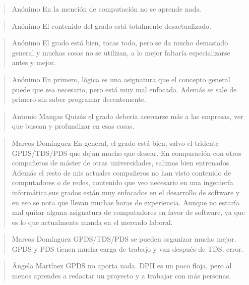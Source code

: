 \begin{quote}{Anónimo}
    En la mención de computación no se aprende nada.
\end{quote}

\begin{quote}{Anónimo}
    El contenido del grado está totalmente desactualizado.
\end{quote}

\begin{quote}{Anónimo}
    El grado está bien, tocas todo, pero se da mucho demasiado general y
    muchas cosas no se utilizan, a lo mejor faltaría especializarse antes
    y mejor.
\end{quote}

\begin{quote}{Anónimo}
    En primero, lógica es una asignatura que el concepto general puede que 
    sea necesario, pero está muy mal enfocada. Además se sale de primero 
    sin saber programar decentemente.
\end{quote}

\begin{quote}{Antonio Mangas}
    Quizás el grado debería acercarse más a las empresas, ver que buscan y 
    profundizar en esas cosas. 
\end{quote}

\begin{quote}{Marcos Domínguez}
    En general, el grado está bien, salvo el tridente GPDS/TDS/PDS que dejan
    mucho que desear. En comparación con otros compañeros de máster de otras
    universidades, salimos bien entrenados. Además el resto de mis actuales
    compañeros no han visto contenido de computadores o de redes, 
    contenido que veo necesario en una ingeniería informática,sus grados
    están muy enfocados en el desarrollo de software y en eso se nota que llevan
    muchas horas de experiencia. Aunque no estaría mal
    quitar alguna asignatura de computadores en favor de software, ya que 
    es lo que actualmente manda en el mercado laboral.
\end{quote}

\begin{quote}{Marcos Domínguez}
    GPDS/TDS/PDS se pueden organizar mucho mejor. GPDS y PDS tienen mucha carga 
    de trabajo y van después de TDS, error.
\end{quote}

\begin{quote}{Ángela Martínez}
    GPDS no aporta nada. DPII es un poco floja, pero al menos 
    aprendes a redactar un proyecto y a trabajar con más personas.
\end{quote}

